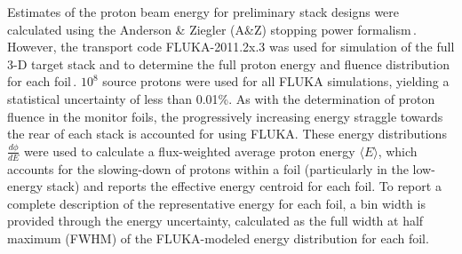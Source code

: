 Estimates of the proton beam energy for preliminary stack designs were calculated using the Anderson \& Ziegler (A\&Z) stopping power formalism\,\cite{Andersen_Ziegler_1977,Ziegler1985,Ziegler1999}.
However, the 
transport code FLUKA-2011.2x.3 was used for simulation of the full 3-D target stack and to determine the full proton energy and fluence distribution for each foil\,\cite{Bohlen2014a}. 
$10^8$ source protons were used for all FLUKA simulations, 
yielding a statistical uncertainty 
of less than 0.01\%.
As with the determination of proton fluence in the monitor foils, the progressively increasing energy straggle towards the rear of each stack is accounted for using 
FLUKA.
These energy distributions $\frac{d\phi}{dE}$ were used to calculate a flux-weighted average proton  energy $\langle E \rangle$, which accounts for the slowing-down of protons within a foil (particularly in the low-energy stack) and reports the effective  energy centroid for each foil.
To report a complete description of the representative energy for each foil, a bin width is provided through the  energy uncertainty, calculated as the full width at half maximum (FWHM) of the FLUKA-modeled energy distribution for each foil.


